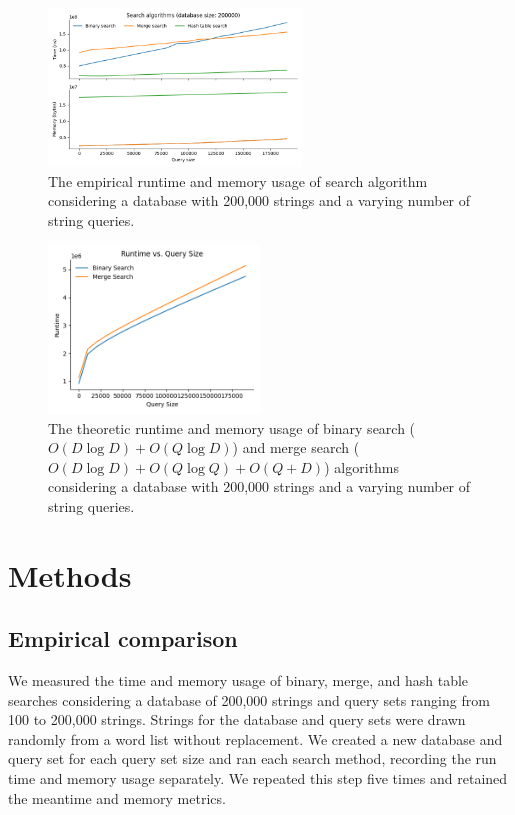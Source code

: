 \documentclass[11pt, letterpaper]{article}
\begin{document}
\begin{figure}[ht] \centering
    \includegraphics[width=0.6\textwidth]{q100-10000_d200000_str}
    \caption{The empirical runtime and memory usage of search algorithm
    considering a database with 200,000 strings and a varying number of
    string queries.}
    \label{fig:timeandmem}
\end{figure}

\begin{figure}[ht]
    \centering
    \includegraphics[width=0.5\textwidth]{q100-10000_d200000_sim}
    \caption{The theoretic runtime and memory usage of binary search 
    ($O(D \log D) + O(Q \log D)$) and merge search 
    ($O(D \log D) + O(Q \log Q) + O(Q + D)$) algorithms considering a
    database with 200,000 strings and a varying number of string queries.}
    \label{fig:timesim}
\end{figure}


\section{Methods}

\subsection{Empirical comparison}

We measured the time and memory usage of binary, merge, and
hash table searches considering a database of 200,000 strings and query sets
ranging from 100 to 200,000 strings. Strings for the database and query sets
were drawn randomly from a word list without replacement. We created a new database and query set for each query set size and ran each search method, recording the run time and memory usage separately. We repeated this step five times and retained the meantime and memory metrics.
\end{document}
